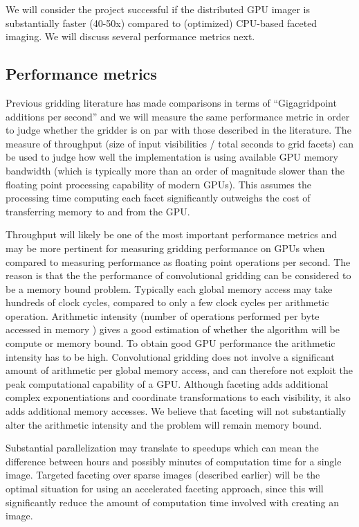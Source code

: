 \documentclass[a4paper, two column]{article}
\begin{document}
We will consider the project successful if the distributed GPU imager is substantially faster (40-50x) compared to (optimized) CPU-based faceted imaging. We will discuss several performance metrics next.

\subsection{Performance metrics}
Previous gridding literature \cite{muscat2014high,romein2012efficient} has made comparisons in terms of ``Gigagridpoint additions per second'' and we will measure the same performance metric in order to judge 
whether the gridder is on par with those described in the literature. The measure of throughput (size of input visibilities / total seconds to grid facets) can be used to judge how well the implementation is 
using available GPU memory bandwidth (which is typically more than an order of magnitude slower than the floating point processing capability of modern GPUs). This assumes the processing time computing each 
facet significantly outweighs the cost of transferring memory to and from the GPU.

Throughput will likely be one of the most important performance metrics and may be more pertinent for measuring gridding performance on GPUs when compared to measuring performance 
as floating point operations per second. The reason is that the the performance of convolutional gridding can be considered to be a memory bound problem. Typically each global memory access may take hundreds of 
clock cycles, compared to only a few clock cycles per arithmetic operation. Arithmetic intensity (number of operations performed per byte accessed in memory \cite{sclocco2014auto}) gives a good estimation of 
whether the algorithm will be compute or memory bound. To obtain good GPU performance the arithmetic intensity has to be high. Convolutional gridding does not involve a significant amount of arithmetic per 
global memory access, and can therefore not exploit the peak computational capability of a GPU. Although faceting adds additional complex exponentiations and coordinate transformations to each visibility, it 
also adds additional memory accesses. We believe that faceting will not substantially alter the arithmetic intensity and the problem will remain memory bound.

Substantial parallelization may translate to speedups which can mean the difference between hours and possibly minutes of computation time for a single image. Targeted faceting over sparse images (described earlier) will
be the optimal situation for using an accelerated faceting approach, since this will significantly reduce the amount of computation time involved with creating an image. 
\end{document}
